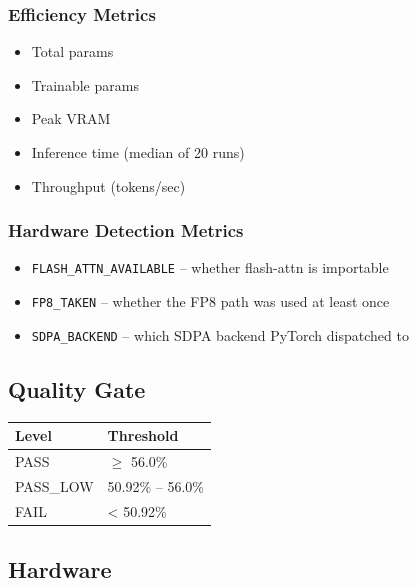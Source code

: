 \subsubsection{Efficiency Metrics}

\begin{itemize}
\item Total params
\item Trainable params
\item Peak VRAM
\item Inference time (median of 20 runs)
\item Throughput (tokens/sec)

\end{itemize}
\subsubsection{Hardware Detection Metrics}

\begin{itemize}
\item \texttt{FLASH\_ATTN\_AVAILABLE} -- whether flash-attn is importable
\item \texttt{FP8\_TAKEN} -- whether the FP8 path was used at least once
\item \texttt{SDPA\_BACKEND} -- which SDPA backend PyTorch dispatched to

\end{itemize}
\subsection{Quality Gate}

\begin{table}[H]
\centering
\small
\begin{tabular}{ll}
\toprule
\textbf{Level} & \textbf{Threshold} \\
\midrule
PASS & $\ge$ 56.0\% \\
PASS\_LOW & 50.92\% -- 56.0\% \\
FAIL & \textless{} 50.92\% \\
\bottomrule
\end{tabular}
\end{table}

\subsection{Hardware}

